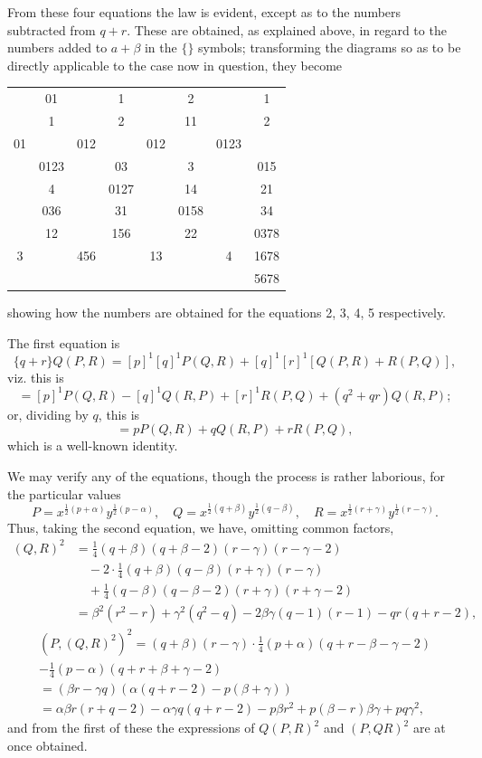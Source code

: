\documentclass[12pt,a4paper]{article}
\theoremstyle{cayley}
\theoremstyle{definition}
\numberwithin{equation}{section}
\begin{document}
From these four equations the law is evident, except as to the numbers subtracted from $q + r$. These are obtained, as explained above, in regard to the numbers added to $a + \beta$ in the $\{\}$ symbols; transforming the diagrams so as to be directly applicable to the case now in question, they become
\begin{center}
\begin{tabular}{cccccccc}
 & 01 & & 1 & & 2 & & 1 \\
 & 1 & & 2 & & 11 & & 2 \\
01 & & 012 & & 012 & & 0123 & \\
 & 0123 & & 03 & & 3 & & 015 \\
 & 4 & & 0127 & & 14 & & 21 \\
 & 036 & & 31 & & 0158 & & 34 \\
 & 12 & & 156 & & 22 & & 0378 \\
3 & & 456 & & 13 & & 4 & 1678 \\
 & & & & & & & 5678
\end{tabular}
\end{center}
showing how the numbers are obtained for the equations 2, 3, 4, 5 respectively.

The first equation is
\[
\{q + r\} Q(P, R) = [p]^1 [q]^1 P(Q, R) + [q]^1 [r]^1 [Q(P, R) + R(P, Q)],
\]
viz. this is
\[
= [p]^1 P(Q, R) - [q]^1 Q(R, P) + [r]^1 R(P, Q) + (q^2 + qr) Q(R, P);
\]
or, dividing by $q$, this is
\[
= p P(Q, R) + q Q(R, P) + r R(P, Q),
\]
which is a well-known identity.

We may verify any of the equations, though the process is rather laborious, for the particular values
\[
P = x^{\frac{1}{2}(p+\alpha)} y^{\frac{1}{2}(p-\alpha)}, \quad Q = x^{\frac{1}{2}(q+\beta)} y^{\frac{1}{2}(q-\beta)}, \quad R = x^{\frac{1}{2}(r+\gamma)} y^{\frac{1}{2}(r-\gamma)}.
\]
Thus, taking the second equation, we have, omitting common factors,
\begin{align*}
(Q, R)^2 &= \tfrac{1}{4}(q + \beta)(q + \beta - 2)(r - \gamma)(r - \gamma - 2) \\
&\quad - 2 \cdot \tfrac{1}{4}(q + \beta)(q - \beta)(r + \gamma)(r - \gamma) \\
&\quad + \tfrac{1}{4}(q - \beta)(q - \beta - 2)(r + \gamma)(r + \gamma - 2) \\
&= \beta^2(r^2 - r) + \gamma^2(q^2 - q) - 2\beta\gamma(q - 1)(r - 1) - qr(q + r - 2),
\end{align*}
\begin{multline*}
(P, (Q, R)^2)^2 = (q + \beta)(r - \gamma) \cdot \tfrac{1}{4}(p + \alpha)(q + r - \beta - \gamma - 2) \\
- \tfrac{1}{4}(p - \alpha)(q + r + \beta + \gamma - 2) \\
= (\beta r - \gamma q)(\alpha(q + r - 2) - p(\beta + \gamma)) \\
= \alpha\beta r(r + q - 2) - \alpha\gamma q(q + r - 2) - p\beta r^2 + p(\beta - r)\beta\gamma + pq\gamma^2,
\end{multline*}
and from the first of these the expressions of $Q(P, R)^2$ and $(P, QR)^2$ are at once obtained.
\end{document}
